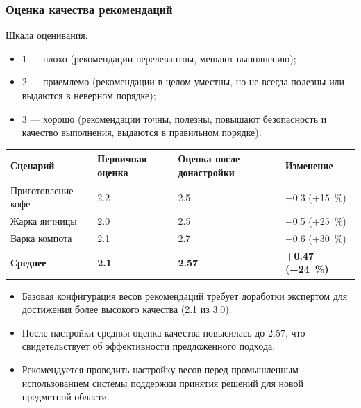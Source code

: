 \documentclass{beamer}
\begin{document}
\begin{frame}
    \frametitle{Оценка качества рекомендаций}
    \footnotesize
    Шкала оценивания:
    \begin{itemize}
        \item[---] 1 --- плохо (рекомендации нерелевантны, мешают выполнению);
        \item[---] 2 --- приемлемо (рекомендации в целом уместны, но не всегда полезны или выдаются в неверном порядке);
        \item[---] 3 --- хорошо (рекомендации точны, полезны, повышают безопасность и качество выполнения, выдаются в правильном порядке).
    \end{itemize}
    \setlength{\tabcolsep}{3pt}
    \begin{table}[H]
        \centering
        \begin{tabular}{|p{}|p{}|p{}|p{}|}
            \hline
            \textbf{Сценарий} & \textbf{Первичная оценка} & \textbf{Оценка после \newline донастройки} & \textbf{Изменение} \\
            \hline
            Приготовление кофе & 2.2 & 2.5 & +0.3 (+15~\%) \\
            \hline
            Жарка яичницы & 2.0 & 2.5 & +0.5 (+25~\%) \\
            \hline
            Варка компота & 2.1 & 2.7 & +0.6 (+30~\%)\\
            \hline
            \textbf{Среднее} & \textbf{2.1} & \textbf{2.57} & \textbf{+0.47 (+24~\%)} \\
            \hline
        \end{tabular}
    \end{table}
    \begin{itemize}
        \item[---] Базовая конфигурация весов рекомендаций требует доработки экспертом для достижения более высокого качества (2.1 из 3.0).
        \item[---] После настройки средняя оценка качества повысилась до 2.57, что свидетельствует об эффективности предложенного подхода.
        \item[---] Рекомендуется проводить настройку весов перед промышленным использованием системы поддержки принятия решений для новой предметной области.
    \end{itemize}
\end{frame}
\end{document}

